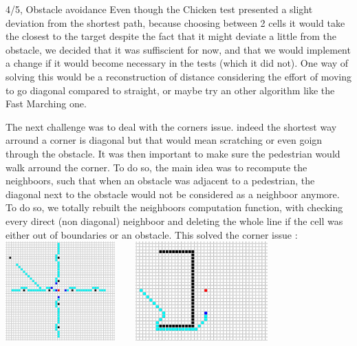 \documentclass[10pt,a4paper]{article}
\begin{document}
\begin{task}{4/5, Obstacle avoidance}
Even though the Chicken test presented a slight deviation from the shortest path, because choosing between 2 cells it would take the closest to the target despite the fact that it might deviate a little from the obstacle, we decided that it was suffiscient for now, and that we would implement a change if it would become necessary in the tests (which it did not). One way of solving this would be a reconstruction of distance considering the effort of moving to go diagonal compared to straight, or maybe try an other algorithm like the Fast Marching one. \newline 

The next challenge was to deal with the corners issue. indeed the shortest way arround a corner is diagonal but that would mean scratching or even goign through the obstacle. It was then important to make sure the pedestrian would walk arround the corner. To do so, the main idea was to recompute the neighboors, such that when an obstacle was adjacent to a pedestrian, the diagonal next to the obstacle would not be considered as a neighboor anymore. To do so, we totally rebuilt the neighboors computation function, with checking every direct (non diagonal) neighboor and deleting the whole line if the cell was either out of boundaries or an obstacle. This solved the corner issue : \newline \newline
\includegraphics[height=3.8cm]{corner1}
~~~
\includegraphics[height=3.8cm]{corner2} \newline \newline

\end{task}

\vfill\eject
\end{document}
